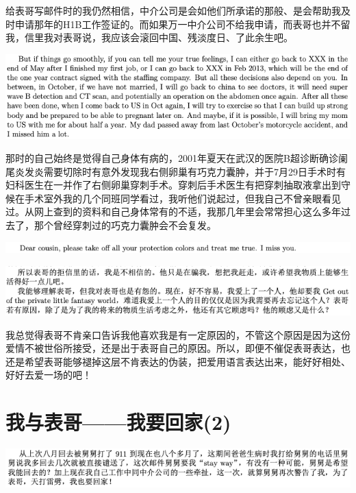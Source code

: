 \documentclass[9pt, b5paper]{article}
\begin{document}
给表哥写邮件时的我仍然相信，中介公司是会如他们所承诺的那般、是会帮助我及时申请那年的H1B工作签证的。而如果万一中介公司不给我申请，而表哥也并不留我，信里我对表哥说，我应该会滚回中国、残淡度日、了此余生吧。

\begin{center}
\includegraphics[width=.9\linewidth]{./pic/p1p116-7.png}
\end{center}

那时的自己始终是觉得自己身体有病的，2001年夏天在武汉的医院B超诊断确诊阑尾炎发炎需要切除时有意外发现我右侧卵巢有巧克力囊肿，并于7月29日手术时有妇科医生在一并作了右侧卵巢穿刺手术。穿刺后手术医生有把穿刺抽取液拿出到守候在手术室外我的几个同班同学看过，我听他们说起过，但我自己不曾亲眼看见过。从网上查到的资料和自己身体常有的不适，我那几年里会常常担心这么多年过去了，那个曾经穿刺过的巧克力囊肿会不会复发。

\begin{center}
\includegraphics[width=.9\linewidth]{./pic/p1p116-8.png}
\end{center}

\begin{center}
\includegraphics[width=.9\linewidth]{./pic/p1p118-3.png}
\end{center}

我总觉得表哥不肯亲口告诉我他喜欢我是有一定原因的，不管这个原因是因为这份爱情不被世俗所接受，还是出于表哥自己的原因。所以，即便不催促表哥表达，也还是希望表哥能够褪掉这层不肯表达的伪装，把爱用语言表达出来，能好好相处、好好去爱一场的吧！

\section{我与表哥——我要回家(2)}
\label{sec:orgaf8a0ec}

\begin{center}
\includegraphics[width=.9\linewidth]{./pic/p1p118-6.png}
\end{center}
\end{document}
